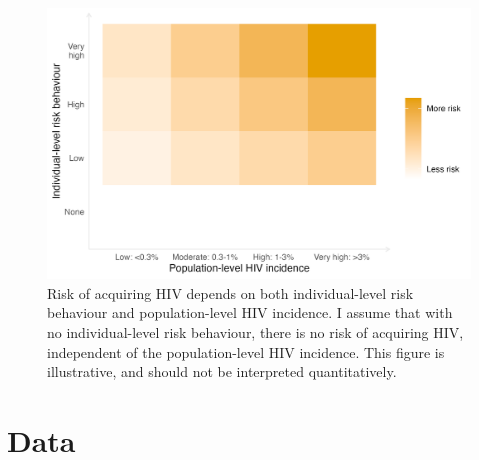 \documentclass[a4paper, nobind]{templates/ociamthesis}
\begin{document}
\begin{figure}

{\centering \includegraphics[width=0.95\linewidth]{figures/multi-agyw/risk-grid} 

}

\caption{Risk of acquiring HIV depends on both individual-level risk behaviour and population-level HIV incidence.
I assume that with no individual-level risk behaviour, there is no risk of acquiring HIV, independent of the population-level HIV incidence.
This figure is illustrative, and should not be interpreted quantitatively.}\label{fig:risk-grid}
\end{figure}

\hypertarget{data}{%
\section{Data}\label{data}}
\end{document}
